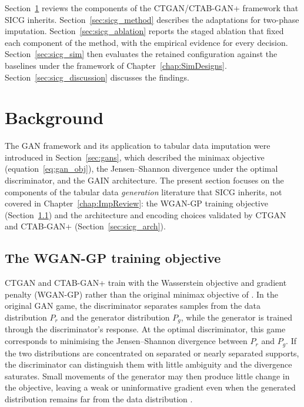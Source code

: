 Section~\ref{sec:sicg_background} reviews the components of the CTGAN/CTAB-GAN+ framework that SICG inherits. Section~\ref{sec:sicg_method} describes the adaptations for two-phase imputation. Section~\ref{sec:sicg_ablation} reports the staged ablation that fixed each component of the method, with the empirical evidence for every decision. Section~\ref{sec:sicg_sim} then evaluates the retained configuration against the baselines under the framework of Chapter~\ref{chap:SimDesigns}. Section~\ref{sec:sicg_discussion} discusses the findings.


\section{Background}
\label{sec:sicg_background}

The GAN framework and its application to tabular data imputation were introduced in Section~\ref{sec:gans}, which described the minimax objective (equation~\ref{eq:gan_obj}), the Jensen--Shannon divergence under the optimal discriminator, and the GAIN architecture. The present section focuses on the components of the tabular data \emph{generation} literature that SICG inherits, not covered in Chapter~\ref{chap:ImpReview}: the WGAN-GP training objective (Section~\ref{sec:sicg_wgangp}) and the architecture and encoding choices validated by CTGAN and CTAB-GAN+ (Section~\ref{sec:sicg_arch}).


\subsection{The WGAN-GP training objective}
\label{sec:sicg_wgangp}

CTGAN and CTAB-GAN+ train with the Wasserstein objective and gradient penalty (WGAN-GP) rather than the original minimax objective of \citet{goodfellow2014generative}. In the original GAN game, the discriminator separates samples from the data distribution \(P_r\) and the generator distribution \(P_g\), while the generator is trained through the discriminator's response. At the optimal discriminator, this game corresponds to minimising the Jensen--Shannon divergence between \(P_r\) and \(P_g\). If the two distributions are concentrated on separated or nearly separated supports, the discriminator can distinguish them with little ambiguity and the divergence saturates. Small movements of the generator may then produce little change in the objective, leaving a weak or uninformative gradient even when the generated distribution remains far from the data distribution \citep{arjovsky2017principled}.

